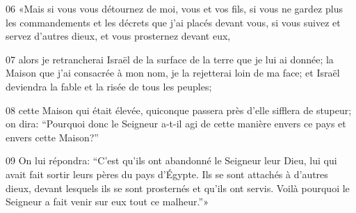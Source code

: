 
06 «Mais si vous vous détournez de moi, vous et vos fils, si vous ne gardez plus les commandements et les décrets que j’ai placés devant vous, si vous suivez et servez d’autres dieux, et vous prosternez devant eux,

07 alors je retrancherai Israël de la surface de la terre que je lui ai donnée; la Maison que j’ai consacrée à mon nom, je la rejetterai loin de ma face; et Israël deviendra la fable et la risée de tous les peuples;

08 cette Maison qui était élevée, quiconque passera près d’elle sifflera de stupeur; on dira: “Pourquoi donc le Seigneur a-t-il agi de cette manière envers ce pays et envers cette Maison?”

09 On lui répondra: “C’est qu’ils ont abandonné le Seigneur leur Dieu, lui qui avait fait sortir leurs pères du pays d’Égypte. Ils se sont attachés à d’autres dieux, devant lesquels ils se sont prosternés et qu’ils ont servis. Voilà pourquoi le Seigneur a fait venir sur eux tout ce malheur.”»
